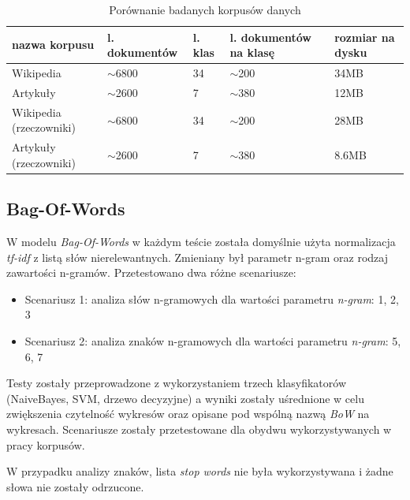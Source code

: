 \begin{table}[ht!]
\centering
\caption{Porównanie badanych korpusów danych}
\label{fig:korpus-compare}
\begin{tabular}{|l|l|l|l|l|}
\hline
nazwa korpusu & l. dokumentów & l. klas & l. dokumentów na klasę & rozmiar na dysku \\ \hline
Wikipedia     & $\sim$6800        & 34         & $\sim$200 & 34MB               \\ \hline
Artykuły      & $\sim$2600        & 7          & $\sim$380  & 12MB              \\ \hline
Wikipedia (rzeczowniki)     & $\sim$6800        & 34         & $\sim$200 & 28MB               \\ \hline
Artykuły (rzeczowniki)     & $\sim$2600        & 7          & $\sim$380 & 8.6MB               \\ \hline
\end{tabular}
\end{table}

\subsection{Bag-Of-Words}

W modelu \textit{Bag-Of-Words} w każdym teście została domyślnie użyta normalizacja \textit{tf-idf} z listą słów nierelewantnych. Zmieniany był parametr n-gram oraz rodzaj zawartości n-gramów. Przetestowano dwa różne scenariusze:
\begin{itemize}
\item Scenariusz 1: analiza słów n-gramowych dla wartości parametru \textit{n-gram}: 1, 2, 3
\item Scenariusz 2: analiza znaków n-gramowych dla wartości parametru \textit{n-gram}: 5, 6, 7
\end{itemize}
Testy zostały przeprowadzone z wykorzystaniem trzech klasyfikatorów (NaiveBayes, SVM, drzewo decyzyjne) a wyniki zostały uśrednione w celu zwiększenia czytelność wykresów oraz opisane pod wspólną nazwą \textit{BoW} na wykresach. Scenariusze zostały przetestowane dla obydwu wykorzystywanych w pracy korpusów.

W przypadku analizy znaków, lista \textit{stop words} nie była wykorzystywana i żadne słowa nie zostały odrzucone. 

